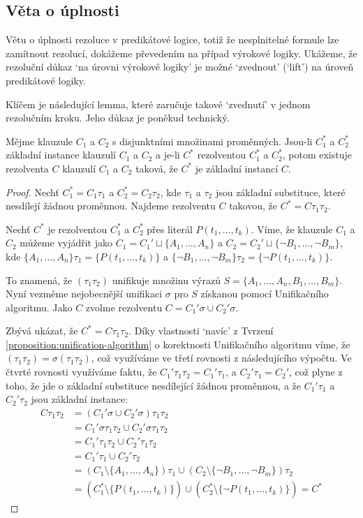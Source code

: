 \subsection{Věta o úplnosti}

Větu o úplnosti rezoluce v predikátové logice, totiž že nesplnitelné formule lze zamítnout rezolucí, dokážeme převedením na případ výrokové logiky. Ukážeme, že rezoluční důkaz `na úrovni výrokové logiky' je možné `zvednout' (`lift') na úroveň predikátové logiky.

Klíčem je následující lemma, které zaručuje takové `zvednutí' v jednom rezolučním kroku. Jeho důkaz je poněkud technický. 

\begin{lemma}\label{lemma:lifting-lemma}
Mějme klauzule $C_1$ a $C_2$ s disjunktními množinami proměnných. Jsou-li $C^*_1$ a $C^*_2$ základní instance klauzulí $C_1$ a $C_2$ a je-li $C^*$ rezolventou $C^*_1$ a $C^*_2$, potom existuje rezolventa $C$ klauzulí $C_1$ a $C_2$ taková, že $C^*$ je základní instancí $C$.
\end{lemma}
\begin{proof}
Nechť $C^*_1=C_1\tau_1$ a $C^*_2=C_2\tau_2$, kde $\tau_1$ a $\tau_2$ jsou základní substituce, které nesdílejí žádnou proměnnou. Najdeme rezolventu $C$ takovou, že $C^*=C\tau_1\tau_2$.

Nechť $C^*$ je rezolventou $C_1^*$ a $C_2^*$ přes literál $P(t_1,\dots,t_k)$. Víme, že klauzule $C_1$ a $C_2$ můžeme vyjádřit jako $C_1=C_1' \sqcup \{A_1,\dots,A_n\}$ a $C_2=C_2' \sqcup \{\neg B_1,\dots,\neg B_m\}$, kde $\{A_1,\dots,A_n\}\tau_1=\{P(t_1,\dots,t_k)\}$ a $\{\neg B_1,\dots,\neg B_m\}\tau_2=\{\neg P(t_1,\dots,t_k)\}$.

To znamená, že $(\tau_1\tau_2)$ unifikuje množinu výrazů $S=\{A_1,\dots,A_n,B_1,\dots,B_m\}$. Nyní vezměme nejobecnější unifikaci $\sigma$ pro $S$ získanou pomocí Unifikačního algoritmu. Jako $C$ zvolme rezolventu $C=C_1'\sigma \cup C_2'\sigma$.

Zbývá ukázat, že $C^*=C\tau_1\tau_2$. Díky vlastnosti `navíc' z Tvrzení \ref{proposition:unification-algorithm} o korektnosti Unifikačního algoritmu víme, že $(\tau_1\tau_2)=\sigma(\tau_1\tau_2)$, což využíváme ve třetí rovnosti z následujícího výpočtu. Ve čtvrté rovnosti využíváme faktu, že $C_1'\tau_1\tau_2=C_1'\tau_1$, a $C_2'\tau_1=C_2'$, což plyne z toho, že jde o základní substituce nesdílející žádnou proměnnou, a že $C_1'\tau_1$ a $C_2'\tau_2$ jsou základní instance:
\begin{align*}
    C\tau_1\tau_2&= (C_1'\sigma \cup C_2'\sigma)\tau_1\tau_2\\
    &=C_1'\sigma\tau_1\tau_2 \cup C_2'\sigma\tau_1\tau_2\\
    &=C_1'\tau_1\tau_2 \cup C_2'\tau_1\tau_2\\
    &=C_1'\tau_1 \cup C_2'\tau_2\\
    &=(C_1\setminus\{A_1,\dots,A_n\})\tau_1\cup (C_2\setminus\{\neg B_1,\dots,\neg B_m\})\tau_2\\
    &=(C_1^*\setminus\{P(t_1,\dots,t_k)\})\cup(C_2^*\setminus \{\neg P(t_1,\dots,t_k)\})=C^*
\end{align*}
\end{proof}

